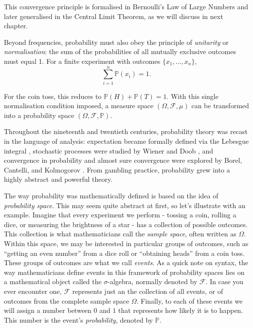 \documentclass{book}
\begin{document}
This convergence principle is formalised in Bernoulli’s Law of Large Numbers and later generalised in the Central Limit Theorem, as we will discuss in next chapter.

\medskip

Beyond frequencies, probability must also obey the principle of \textit{unitarity} or \textit{normalisation}: the sum of the probabilities of all mutually exclusive outcomes must equal 1. For a finite experiment with outcomes $\{x_1,\ldots, x_n\}$,
\begin{equation}
    \sum_{i=1}^{n} \mathbb{P}(x_i) = 1.
    \label{eq:unitarity}
\end{equation}

For the coin toss, this reduces to $\mathbb{P}(H)+\mathbb{P}(T)=1$. With this single normalisation condition imposed, a measure space $(\Omega,\mathcal{F},\mu)$ can be transformed into a probability space $(\Omega,\mathcal{F},\mathbb{P})$.

\medskip

Throughout the nineteenth and twentieth centuries, probability theory was recast in the language of analysis: expectation became formally defined via the Lebesgue integral \cite{lebesgue1902}, stochastic processes were studied by Wiener and Doob \cite{doob1953}, and convergence in probability and almost sure convergence were explored by Borel, Cantelli, and Kolmogorov \cite{billingsley1995}. From gambling practice, probability grew into a highly abstract and powerful theory.

\medskip

The way probability was mathematically defined is based on the idea of \textit{probability space}. This may seem quite abstract at first, so let's illustrate with an example. Imagine that every experiment we perform - tossing a coin, rolling a dice, or measuring the brightness of a star - has a collection of possible outcomes. This collection is what mathematicians call the \textit{sample space}, often written as $\Omega$. Within this space, we may be interested in particular groups of outcomes, such as ``getting an even number'' from a dice roll or ``obtaining heads'' from a coin toss. These groups of outcomes are what we call \textit{events}. As a quick note on syntax, the way mathematicians define events in this framework of probability spaces lies on a mathematical object called the $\sigma$-algebra, normally denoted by $\mathcal{F}$. In case you ever encounter one, $\mathcal{F}$ represents just an the collection of all events, or of outcomes from the complete sample space $\Omega$. Finally, to each of these events we will assign a number between $0$ and $1$ that represents how likely it is to happen. This number is the event’s \textit{probability}, denoted by $\mathbb{P}$. 
\end{document}
